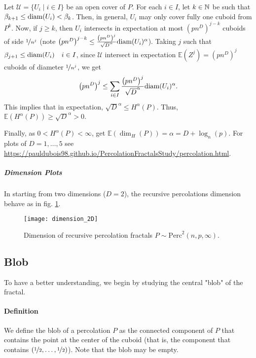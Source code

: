 Let $\mathcal{U} = \{ U_i \mid i \in I \}$ be an open cover of $P$.
For each $i \in I$, let $k \in \mathbb{N}$ be such that $\beta_{k+1} \leq \text{diam}(U_i) < \beta_k$.
Then, in general, $U_i$ may only cover fully one cuboid from $P^k$.
Now, if $j \geq k$, then $U_i$ intersects in expectation at most $\left( p n^D \right)^{j-k}$ cuboids of side $\nicefrac{1}{n^j}$ (note $\left( p n^D \right)^{j-k} \leq \frac{\left( pn^D \right)^j}{\sqrt{D}^{\alpha}} \text{diam}(U_i)^{\alpha}$).
Taking $j$ such that $\beta_{j+1} \leq \text{diam}(U_i) \quad i \in I$, since $\mathcal{U}$ intersect in expectation $\mathbb{E}(Z^j) = \left( p n^D \right)^j$ cuboids of diameter $\nicefrac{1}{n^j}$, we get
$$\left( p n^D \right)^j \leq \sum_{i \in I} \frac{\left( pn^D \right)^j}{\sqrt{D}^{\alpha}} \text{diam}(U_i)^{\alpha}.$$
This implies that in expectation, $\sqrt{D}^{\alpha} \leq H^{\alpha}(P)$.
Thus, $\mathbb{E} \left( H^{\alpha}(P) \right)  \geq \sqrt{D}^{\alpha} > 0$.

Finally, as $0 < H^{\alpha}(P) < \infty$, get $\mathbb{E}(\dim_H(P)) = \alpha = D + \log_n(p)$.
For plots of $D = 1,\dots,5$ see \url{https://pauldubois98.github.io/PercolationFractalsStudy/percolation.html}.
\subparagraph{Dimension Plots}
In starting from two dimensions ($D = 2$), the recursive percolations dimension behave as in fig. \ref{fig:dimension2D}.
\begin{figure}[!h]
	\centering
	\texttt{[image: dimension\_2D]}
	\caption{Dimension of recursive percolation fractals $P \sim \text{Perc}^2(n,p,\infty)$.}
	\label{fig:dimension2D}
\end{figure}

\subsection{Blob}
To have a better understanding, we begin by studying the central "blob" of the fractal.
\paragraph{Definition}
We define the blob of a percolation $P$ as the connected component of $P$ that contains the point at the center of the cuboid (that is, the component that contains $(\nicefrac{1}{2}, \dots, \nicefrac{1}{2})$).
Note that the blob may be empty.

